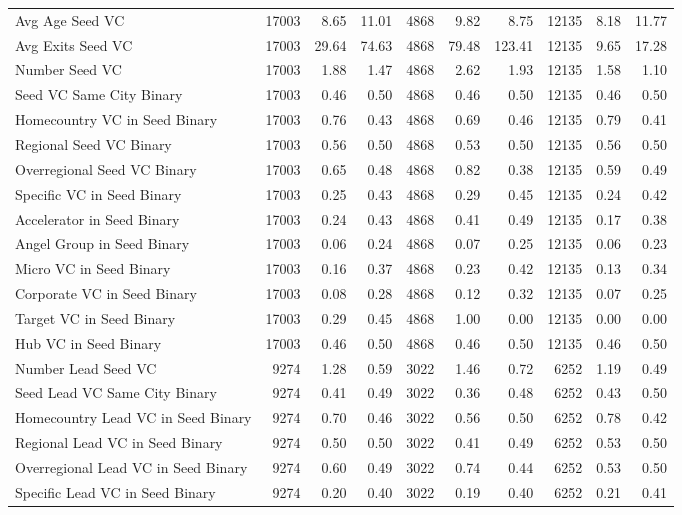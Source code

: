 {\begin{table}[!h]
{\begin{tabular}[t]{lrrrrrrrrr}
\addlinespace
Avg Age Seed VC & 17003 & 8.65 & 11.01 & 4868 & 9.82 & 8.75 & 12135 & 8.18 & 11.77\\
Avg Exits Seed VC & 17003 & 29.64 & 74.63 & 4868 & 79.48 & 123.41 & 12135 & 9.65 & 17.28\\
Number Seed VC & 17003 & 1.88 & 1.47 & 4868 & 2.62 & 1.93 & 12135 & 1.58 & 1.10\\
Seed VC Same City Binary & 17003 & 0.46 & 0.50 & 4868 & 0.46 & 0.50 & 12135 & 0.46 & 0.50\\
Homecountry VC in Seed Binary & 17003 & 0.76 & 0.43 & 4868 & 0.69 & 0.46 & 12135 & 0.79 & 0.41\\
\addlinespace
Regional Seed VC Binary & 17003 & 0.56 & 0.50 & 4868 & 0.53 & 0.50 & 12135 & 0.56 & 0.50\\
Overregional Seed VC Binary & 17003 & 0.65 & 0.48 & 4868 & 0.82 & 0.38 & 12135 & 0.59 & 0.49\\
Specific VC in Seed Binary & 17003 & 0.25 & 0.43 & 4868 & 0.29 & 0.45 & 12135 & 0.24 & 0.42\\
Accelerator in Seed Binary & 17003 & 0.24 & 0.43 & 4868 & 0.41 & 0.49 & 12135 & 0.17 & 0.38\\
Angel Group in Seed Binary & 17003 & 0.06 & 0.24 & 4868 & 0.07 & 0.25 & 12135 & 0.06 & 0.23\\
\addlinespace
Micro VC in Seed Binary & 17003 & 0.16 & 0.37 & 4868 & 0.23 & 0.42 & 12135 & 0.13 & 0.34\\
Corporate VC in Seed Binary & 17003 & 0.08 & 0.28 & 4868 & 0.12 & 0.32 & 12135 & 0.07 & 0.25\\
Target VC in Seed Binary & 17003 & 0.29 & 0.45 & 4868 & 1.00 & 0.00 & 12135 & 0.00 & 0.00\\
Hub VC in Seed Binary & 17003 & 0.46 & 0.50 & 4868 & 0.46 & 0.50 & 12135 & 0.46 & 0.50\\
Number Lead Seed VC & 9274 & 1.28 & 0.59 & 3022 & 1.46 & 0.72 & 6252 & 1.19 & 0.49\\
\addlinespace
Seed Lead VC Same City Binary & 9274 & 0.41 & 0.49 & 3022 & 0.36 & 0.48 & 6252 & 0.43 & 0.50\\
Homecountry Lead VC in Seed Binary & 9274 & 0.70 & 0.46 & 3022 & 0.56 & 0.50 & 6252 & 0.78 & 0.42\\
Regional Lead VC in Seed Binary & 9274 & 0.50 & 0.50 & 3022 & 0.41 & 0.49 & 6252 & 0.53 & 0.50\\
Overregional Lead VC in Seed Binary & 9274 & 0.60 & 0.49 & 3022 & 0.74 & 0.44 & 6252 & 0.53 & 0.50\\
Specific Lead VC in Seed Binary & 9274 & 0.20 & 0.40 & 3022 & 0.19 & 0.40 & 6252 & 0.21 & 0.41\\

\end{tabular}}
\end{table}}
